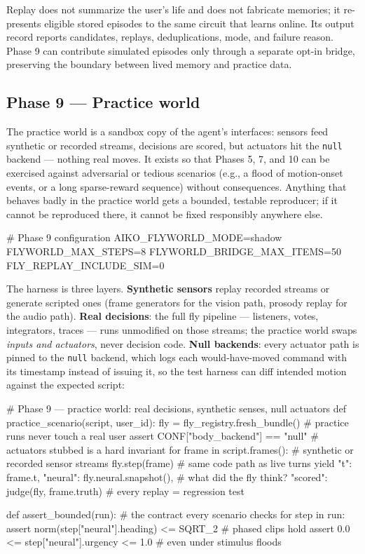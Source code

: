 \documentclass[11pt]{article}
\begin{document}
Replay does not summarize the user's life and does not fabricate memories; it re-presents eligible stored episodes to the same circuit that learns online. Its output record reports candidates, replays, deduplications, mode, and failure reason. Phase 9 can contribute simulated episodes only through a separate opt-in bridge, preserving the boundary between lived memory and practice data.

\subsection{Phase 9 — Practice world}

The practice world is a sandbox copy of the agent's interfaces: sensors feed synthetic or recorded streams, decisions are scored, but actuators hit the \texttt{null} backend — nothing real moves. It exists so that Phases 5, 7, and 10 can be exercised against adversarial or tedious scenarios (e.g., a flood of motion-onset events, or a long sparse-reward sequence) without consequences. Anything that behaves badly in the practice world gets a bounded, testable reproducer; if it cannot be reproduced there, it cannot be fixed responsibly anywhere else.

\begin{CodeBlock}
# Phase 9 configuration
AIKO_FLYWORLD_MODE=shadow
FLYWORLD_MAX_STEPS=8
FLYWORLD_BRIDGE_MAX_ITEMS=50
FLY_REPLAY_INCLUDE_SIM=0
\end{CodeBlock}

The harness is three layers. \textbf{Synthetic sensors} replay recorded streams or generate scripted ones (frame generators for the vision path, prosody replay for the audio path). \textbf{Real decisions}: the full fly pipeline — listeners, votes, integrators, traces — runs unmodified on those streams; the practice world swaps \emph{inputs and actuators}, never decision code. \textbf{Null backends}: every actuator path is pinned to the \texttt{null} backend, which logs each would-have-moved command with its timestamp instead of issuing it, so the test harness can diff intended motion against the expected script:

\begin{CodeBlock}
# Phase 9 — practice world: real decisions, synthetic senses, null actuators
def practice_scenario(script, user_id):
    fly = fly_registry.fresh_bundle()      # practice runs never touch a real user
    assert CONF["body_backend"] == "null"  # actuators stubbed is a hard invariant
    for frame in script.frames():          # synthetic or recorded sensor streams
        fly.step(frame)                    # same code path as live turns
        yield {"t": frame.t,
               "neural": fly.neural.snapshot(),   # what did the fly think?
               "scored": judge(fly, frame.truth)} # every replay = regression test

def assert_bounded(run):                  # the contract every scenario checks
    for step in run:
        assert norm(step["neural"].heading) <= SQRT_2   # phased clips hold
        assert 0.0 <= step["neural"].urgency <= 1.0   # even under stimulus floods
\end{CodeBlock}
\end{document}

